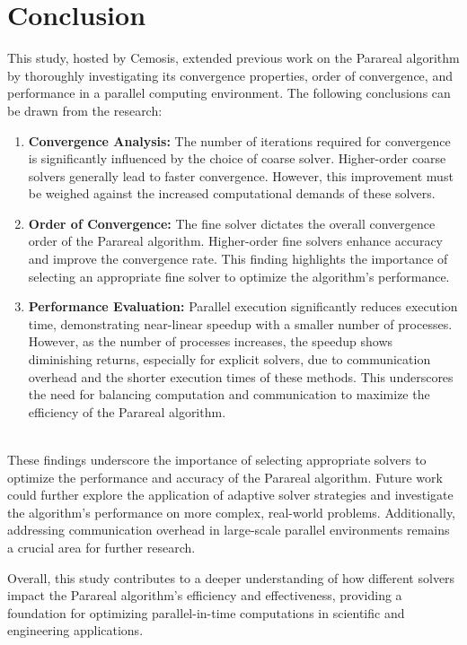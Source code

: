 \documentclass[a4paper,12pt,french]{article}
\begin{document}
\section{Conclusion}
This study, hosted by Cemosis, extended previous work on the Parareal algorithm by thoroughly investigating its convergence properties, order of convergence, and performance in a parallel computing environment. The following conclusions can be drawn from the research:

\begin{enumerate}
    \item \textbf{Convergence Analysis:} The number of iterations required for convergence is significantly influenced by the choice of coarse solver. Higher-order coarse solvers generally lead to faster convergence. However, this improvement must be weighed against the increased computational demands of these solvers.
    \item \textbf{Order of Convergence:} The fine solver dictates the overall convergence order of the Parareal algorithm. Higher-order fine solvers enhance accuracy and improve the convergence rate. This finding highlights the importance of selecting an appropriate fine solver to optimize the algorithm’s performance.
    \item \textbf{Performance Evaluation:} Parallel execution significantly reduces execution time, demonstrating near-linear speedup with a smaller number of processes. However, as the number of processes increases, the speedup shows diminishing returns, especially for explicit solvers, due to communication overhead and the shorter execution times of these methods. This underscores the need for balancing computation and communication to maximize the efficiency of the Parareal algorithm.
\end{enumerate}\\

These findings underscore the importance of selecting appropriate solvers to optimize the performance and accuracy of the Parareal algorithm. Future work could further explore the application of adaptive solver strategies and investigate the algorithm's performance on more complex, real-world problems. Additionally, addressing communication overhead in large-scale parallel environments remains a crucial area for further research.

Overall, this study contributes to a deeper understanding of how different solvers impact the Parareal algorithm's efficiency and effectiveness, providing a foundation for optimizing parallel-in-time computations in scientific and engineering applications.

\newpage

\vspace*{\fill}

\end{document}
